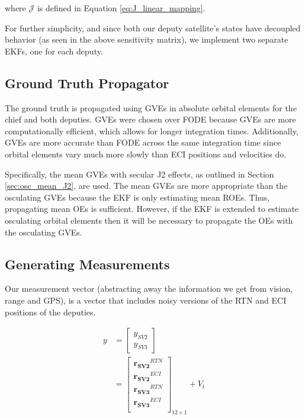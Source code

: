 where $\mathcal{J}$ is defined in Equation \ref{eq:J_linear_mapping}.

For further simplicity, and since both our deputy satellite's states have decoupled behavior (as seen in the above sensitivity matrix), we implement two separate EKFs, one for each deputy.

\subsection{Ground Truth Propagator}
The ground truth is propagated using GVEs in absolute orbital elements for the chief and both deputies. GVEs were chosen over FODE because GVEs are more computationally efficient, which allows for longer integration times. Additionally, GVEs are more accurate than FODE across the same integration time since orbital elements vary much more slowly than ECI positions and velocities do. 

Specifically, the mean GVEs with secular J2 effects, as outlined in Section \ref{sec:osc_mean_J2}, are used. The mean GVEs are more appropriate than the osculating GVEs because the EKF is only estimating mean ROEs. Thus, propagating mean OEs is sufficient. However, if the EKF is extended to estimate osculating orbital elements then it will be necessary to propagate the OEs with the osculating GVEs. 

\subsection{Generating Measurements}

Our measurement vector (abstracting away the information we get from vision, range and GPS), is a vector that includes noisy versions of the RTN and ECI positions of the deputies. 

\begin{align}
    y &= \begin{bmatrix}
        y_{SV2} \\
        y_{SV3}
    \end{bmatrix} \\
    &= \begin{bmatrix}
        \boldsymbol{r_{SV2}}^{RTN}\\
        \boldsymbol{r_{SV2}}^{ECI} \\
        \boldsymbol{r_{SV3}}^{RTN} \\
        \boldsymbol{r_{SV3}}^{ECI} \\
    \end{bmatrix}_{12\times 1} + V_t
\end{align}

